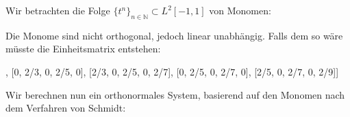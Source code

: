 \documentclass[letterpaper,10pt,english]{jupyterBook}
\begin{document}
Wir betrachten die Folge \(\{t^n\}_{n\in\mathbb{N}}\subset L^2[-1,1]\) von Monomen:

\begin{sphinxVerbatim}[commandchars=\\\{\}]
  \PYG{p}{[}    \PYG{p}{]}
\end{sphinxVerbatim}

\begin{sphinxVerbatim}[commandchars=\\\{\}]
[1, t, t**2, t**3, t**4]
\end{sphinxVerbatim}

Die Monome sind nicht orthogonal, jedoch linear unabhängig. Falls dem so wäre müsste die Einheitsmatrix entstehen:

\begin{sphinxVerbatim}[commandchars=\\\{\}]
  \PYG{p}{[}\PYG{p}{[}\PYG{p}{[}\PYG{p}{]}\PYG{p}{[}\PYG{p}{]}    \PYG{p}{]}    \PYG{p}{]}
\end{sphinxVerbatim}

\begin{sphinxVerbatim}[commandchars=\\\{\}]
[[2, 0, 2/3, 0, 2/5],
 [0, 2/3, 0, 2/5, 0],
 [2/3, 0, 2/5, 0, 2/7],
 [0, 2/5, 0, 2/7, 0],
 [2/5, 0, 2/7, 0, 2/9]]
\end{sphinxVerbatim}

Wir berechnen nun ein orthonormales System, basierend auf den Monomen nach dem Verfahren von Schmidt:

\begin{sphinxVerbatim}[commandchars=\\\{\}]
  \PYG{p}{[}\PYG{p}{[}\PYG{p}{]}\PYG{p}{[}\PYG{p}{]}\PYG{p}{]}
   
      
       
          \PYG{p}{[}\PYG{p}{]}\PYG{p}{[}\PYG{p}{]}\PYG{p}{[}\PYG{p}{]}
    \PYG{p}{[}\PYG{p}{]}
\end{sphinxVerbatim}
\end{document}
